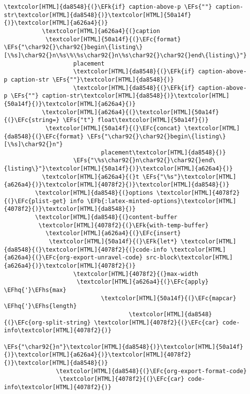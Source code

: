 \documentclass{scrartcl}
\newcommand{\EFk}[1]{\textcolor{EFk}{#1}} %
\newcommand{\EFs}[1]{\textcolor{EFs}{#1}} %
\newcommand{\EFb}[1]{\textcolor{EFb}{#1}} %
\newcommand{\EFc}[1]{\textcolor{EFc}{#1}} %
\newcommand{\EFhq}[1]{\textcolor{EFhq}{#1}} %
\newcommand{\EFhs}[1]{\textcolor{EFhs}{#1}} %
\begin{document}
\begin{enumerate}
\begin{Code}
\begin{Verbatim}[]
                    \textcolor[HTML]{da8548}{(}\EFk{if} caption-above-p \EFs{""} caption-str\textcolor[HTML]{da8548}{)}\textcolor[HTML]{50a14f}{)}\textcolor[HTML]{a626a4}{)}
           \textcolor[HTML]{a626a4}{(}caption
            \textcolor[HTML]{50a14f}{(}\EFc{format} \EFs{"\char92{}\char92{}begin\{listing\}[\%s]\char92{}n\%s\%\%s\char92{}n\%s\char92{}\char92{}end\{listing\}"}
                    placement
                    \textcolor[HTML]{da8548}{(}\EFk{if} caption-above-p caption-str \EFs{""}\textcolor[HTML]{da8548}{)}
                    \textcolor[HTML]{da8548}{(}\EFk{if} caption-above-p \EFs{""} caption-str\textcolor[HTML]{da8548}{)}\textcolor[HTML]{50a14f}{)}\textcolor[HTML]{a626a4}{)}
           \textcolor[HTML]{a626a4}{(}\textcolor[HTML]{50a14f}{(}\EFc{string=} \EFs{"t"} float\textcolor[HTML]{50a14f}{)}
            \textcolor[HTML]{50a14f}{(}\EFc{concat} \textcolor[HTML]{da8548}{(}\EFc{format} \EFs{"\char92{}\char92{}begin\{listing\}[\%s]\char92{}n"}
                            placement\textcolor[HTML]{da8548}{)}
                    \EFs{"\%s\char92{}n\char92{}\char92{}end\{listing\}"}\textcolor[HTML]{50a14f}{)}\textcolor[HTML]{a626a4}{)}
           \textcolor[HTML]{a626a4}{(}t \EFs{"\%s"}\textcolor[HTML]{a626a4}{)}\textcolor[HTML]{4078f2}{)}\textcolor[HTML]{da8548}{)}
         \textcolor[HTML]{da8548}{(}options \textcolor[HTML]{4078f2}{(}\EFc{plist-get} info \EFb{:latex-minted-options}\textcolor[HTML]{4078f2}{)}\textcolor[HTML]{da8548}{)}
         \textcolor[HTML]{da8548}{(}content-buffer
          \textcolor[HTML]{4078f2}{(}\EFk{with-temp-buffer}
            \textcolor[HTML]{a626a4}{(}\EFc{insert}
             \textcolor[HTML]{50a14f}{(}\EFk{let*} \textcolor[HTML]{da8548}{(}\textcolor[HTML]{4078f2}{(}code-info \textcolor[HTML]{a626a4}{(}\EFc{org-export-unravel-code} src-block\textcolor[HTML]{a626a4}{)}\textcolor[HTML]{4078f2}{)}
                    \textcolor[HTML]{4078f2}{(}max-width
                     \textcolor[HTML]{a626a4}{(}\EFc{apply} \EFhq{'}\EFhs{max}
                            \textcolor[HTML]{50a14f}{(}\EFc{mapcar} \EFhq{'}\EFhs{length}
                                    \textcolor[HTML]{da8548}{(}\EFc{org-split-string} \textcolor[HTML]{4078f2}{(}\EFc{car} code-info\textcolor[HTML]{4078f2}{)}
                                                      \EFs{"\char92{}n"}\textcolor[HTML]{da8548}{)}\textcolor[HTML]{50a14f}{)}\textcolor[HTML]{a626a4}{)}\textcolor[HTML]{4078f2}{)}\textcolor[HTML]{da8548}{)}
               \textcolor[HTML]{da8548}{(}\EFc{org-export-format-code}
                \textcolor[HTML]{4078f2}{(}\EFc{car} code-info\textcolor[HTML]{4078f2}{)}

\end{Verbatim}
\end{Code}
\end{enumerate}
\end{document}
